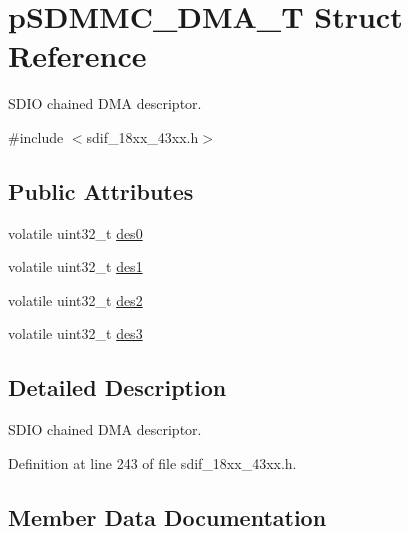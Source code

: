 \hypertarget{structp_s_d_m_m_c___d_m_a___t}{}\section{p\+S\+D\+M\+M\+C\+\_\+\+D\+M\+A\+\_\+T Struct Reference}
\label{structp_s_d_m_m_c___d_m_a___t}


S\+D\+IO chained D\+MA descriptor.  




{\ttfamily \#include $<$sdif\+\_\+18xx\+\_\+43xx.\+h$>$}

\subsection*{Public Attributes}
\begin{DoxyCompactItemize}
\item 
volatile uint32\+\_\+t \hyperlink{structp_s_d_m_m_c___d_m_a___t_ae684dbd70673a99259fb61d785c781b3}{des0}
\item 
volatile uint32\+\_\+t \hyperlink{structp_s_d_m_m_c___d_m_a___t_a0f604ca39c809e27bc39497d90e8dd85}{des1}
\item 
volatile uint32\+\_\+t \hyperlink{structp_s_d_m_m_c___d_m_a___t_a4bc7f46c9c2e51af5c78208f945f2943}{des2}
\item 
volatile uint32\+\_\+t \hyperlink{structp_s_d_m_m_c___d_m_a___t_ae1b9bbd00fa9ee1d25ba3554fd448c9b}{des3}
\end{DoxyCompactItemize}


\subsection{Detailed Description}
S\+D\+IO chained D\+MA descriptor. 

Definition at line 243 of file sdif\+\_\+18xx\+\_\+43xx.\+h.



\subsection{Member Data Documentation}
\mbox{\label{structp_s_d_m_m_c___d_m_a___t_ae684dbd70673a99259fb61d785c781b3}} 

